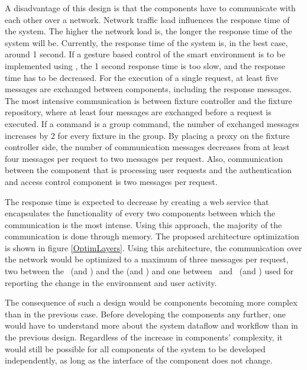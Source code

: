 	A disadvantage of this design is that the components have to communicate with each other over a network. Network traffic load influences the response time of the system. The higher the network load is, the longer the response time of the system will be. Currently, the response time of the system is, in the best case, around 1 second. If a gesture based control of the smart environment is to be implemented using \seif, the 1 second response time is too slow, and the response time has to be decreased.
 For the execution of a single request, at least five messages are exchanged between components, including the response messages. The most intensive communication is between fixture controller and the fixture repository, where at least four messages are exchanged before a request is executed. If a command is a group command, the number of exchanged messages increases by 2 for every fixture in the group. By placing a proxy on the fixture controller side, the number of communication messages decreases from at least four messages per request to two messages per request. Also, communication between the component that is processing user requests and the authentication and access control component is two messages per request. 
 
 
 The response time is expected to decrease by creating a web service that encapsulates the functionality of every two components between which the communication is the most intense. Using this approach, the majority of the communication is done through memory. The proposed architecture optimization is shown in figure \ref{OptimLayers}. Using this architecture, the communication over the network would be optimized to a maximum of three messages per request, two between the \ra\ (and \aac) and the \fc (and \fr) and one between \fr\ and \dm\ (and \et) used for reporting the change in the environment and user activity. 


The consequence of such a design would be components becoming more complex than in the previous case. Before developing the components any further, one would have to understand more about the system dataflow and workflow than in the previous design. Regardless of the increase in components' complexity, it would still be possible for all components of the system to be developed independently, as long as the interface of the component does not change. \\

